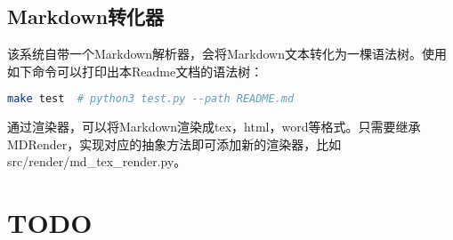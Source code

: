 \documentclass[12pt, letterpaper]{ctexrep}
\begin{document}
\section{Markdown转化器}
该系统自带一个Markdown解析器，会将Markdown文本转化为一棵语法树。使用如下命令可以打印出本Readme文档的语法树：

\begin{lstlisting}[language=Bash]
make test  # python3 test.py --path README.md
\end{lstlisting}

通过渲染器，可以将Markdown渲染成tex，html，word等格式。只需要继承MDRender，实现对应的抽象方法即可添加新的渲染器，比如src/render/md\_tex\_render.py。




\chapter{TODO}
\end{document}
